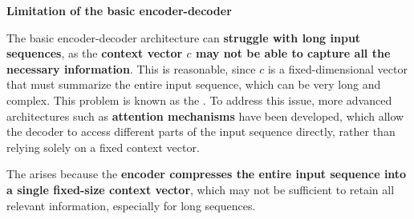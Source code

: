 \highspace
\begin{flushleft}
    \textcolor{Red2}{ \textbf{Limitation of the basic encoder-decoder}}
\end{flushleft}
The basic encoder-decoder architecture can \textbf{struggle with long input sequences}, as the \textbf{context vector $c$ may not be able to capture all the necessary information}. This is reasonable, since $c$ is a fixed-dimensional vector that must summarize the entire input sequence, which can be very long and complex. This problem is known as the . To address this issue, more advanced architectures such as \textbf{attention mechanisms} have been developed, which allow the decoder to access different parts of the input sequence directly, rather than relying solely on a fixed context vector.

\highspace
\begin{definitionbox}
    The  arises because the \textbf{encoder compresses the entire input sequence into a single fixed-size context vector}, which may not be sufficient to retain all relevant information, especially for long sequences.
\end{definitionbox}